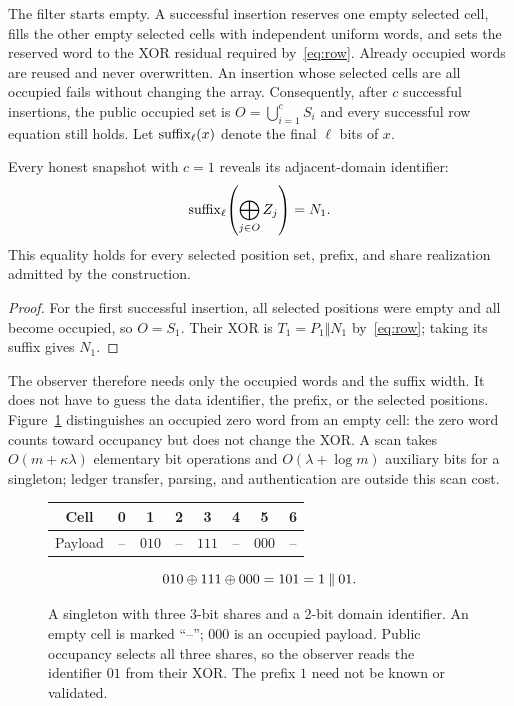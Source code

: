 The filter starts empty. A successful insertion reserves one empty selected
cell, fills the other empty selected cells with independent uniform words,
and sets the reserved word to the XOR residual required by~\eqref{eq:row}.
Already occupied words are reused and never overwritten. An insertion whose
selected cells are all occupied fails without changing the array. Consequently,
after $c$ successful insertions, the public occupied set is
$O=\bigcup_{i=1}^{c}S_i$ and every successful row equation still holds.
Let $\operatorname{suffix}_\ell(x)$ denote the final $\ell$ bits of $x$.

\begin{proposition}
\label{prop:singleton}
Every honest snapshot with $c=1$ reveals its adjacent-domain identifier:
\begin{equation}
  \operatorname{suffix}_\ell\!\left(\bigoplus_{j\in O}Z_j\right)=N_1.
  \label{eq:singleton}
\end{equation}
This equality holds for every selected position set, prefix, and share
realization admitted by the construction.
\end{proposition}

\begin{proof}
For the first successful insertion, all selected positions were empty and
all become occupied, so $O=S_1$. Their XOR is $T_1=P_1\Vert N_1$
by~\eqref{eq:row}; taking its suffix gives $N_1$.
\end{proof}

The observer therefore needs only the occupied words and the suffix width.
It does not have to guess the data identifier, the prefix, or the selected
positions. Figure~\ref{fig:example} distinguishes an occupied zero word from
an empty cell: the zero word counts toward occupancy but does not change the XOR.
A scan takes
$O(m+\kappa\lambda)$ elementary bit operations and
$O(\lambda+\log m)$ auxiliary bits for a singleton; ledger transfer,
parsing, and authentication are outside this scan cost.

\begin{figure}[ht]
\centering
\begin{tabular}{c*{7}{c}}
\toprule
Cell & 0 & 1 & 2 & 3 & 4 & 5 & 6\\
\midrule
Payload & -- & $010$ & -- & $111$ & -- & $000$ & --\\
\bottomrule
\end{tabular}
\[
  010\mathbin{\oplus}111\mathbin{\oplus}000=101=1\mathbin\Vert01.
\]
\caption{A singleton with three 3-bit shares and a 2-bit domain identifier.
An empty cell is marked ``--''; $000$ is an occupied payload. Public occupancy
selects all three shares, so the observer reads the identifier $01$ from their
XOR. The prefix $1$ need not be known or validated.}
\label{fig:example}
\end{figure}

